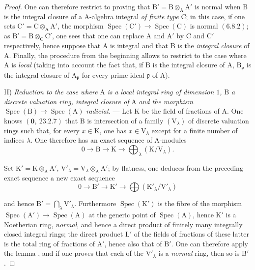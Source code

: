 \begin{proof}
One can therefore restrict to proving that $\mathrm{B}'=\mathrm{B}\otimes_\mathrm{A}\mathrm{A}'$ is normal when $\mathrm{B}$
is the integral closure of a $\mathrm{A}$-algebra integral \emph{of finite type} $\mathrm{C}$; in this case, if one sets
$\mathrm{C}'=\mathrm{C}\otimes_\mathrm{A}\mathrm{A}'$, the morphism $\operatorname{Spec}(\mathrm{C}')\to\operatorname{Spec}(\mathrm{C})$ is normal $(6.8.2)$; as
$\mathrm{B}'=\mathrm{B}\otimes_\mathrm{C}\mathrm{C}'$,
one sees that one can replace $\mathrm{A}$ and $\mathrm{A}'$ by $\mathrm{C}$ and $\mathrm{C}'$ respectively, hence suppose that $\mathrm{A}$
is integral and that $\mathrm{B}$ is the \emph{integral closure} of $\mathrm{A}$. Finally, the procedure from the beginning allows to
restrict to the case where $\mathrm{A}$ is \emph{local} (taking into account the fact that, if $\mathrm{B}$ is the integral closure of $\mathrm{A}$,
$\mathrm{B}_\mathfrak{p}$ is the integral closure of $\mathrm{A}_\mathfrak{p}$ for every prime ideal $\mathfrak{p}$ of $\mathrm{A}$).

II) \emph{Reduction to the case where} $\mathrm{A}$ \emph{is a local integral ring of dimension $1$,} $\mathrm{B}$ \emph{a discrete
valuation ring, integral closure of} $\mathrm{A}$ \emph{and the morphism} $\operatorname{Spec}(\mathrm{B})\to\operatorname{Spec}(\mathrm{A})$ \emph{radicial.} ---
Let $\mathrm{K}$ be the field of fractions of $\mathrm{A}$. One knows $(\mathbf{0},~23.2.7)$ that $\mathrm{B}$ is intersection of a
family $(\mathrm{V}_\lambda)$ of discrete valuation rings such that, for every $x\in\mathrm{K}$, one has $x\in\mathrm{V}_\lambda$
except for a finite number of indices $\lambda$. One therefore has an exact sequence of $\mathrm{A}$-modules
\[
  0\to\mathrm{B}\to\mathrm{K}\to\bigoplus_\lambda(\mathrm{K}/\mathrm{V}_\lambda).
\]

Set $\mathrm{K}'=\mathrm{K}\otimes_\mathrm{A}\mathrm{A}'$, $\mathrm{V}'_\lambda=\mathrm{V}_\lambda\otimes_\mathrm{A}\mathrm{A}'$; by flatness, one deduces from the preceding
exact sequence a new exact sequence
\[
  0\to\mathrm{B}'\to\mathrm{K}'\to\bigoplus(\mathrm{K}'_\lambda/\mathrm{V}'_\lambda)
\]


and hence $\mathrm{B}'=\bigcap_\lambda\mathrm{V}'_\lambda$. Furthermore $\operatorname{Spec}(\mathrm{K}')$ is the fibre of the morphism $\operatorname{Spec}(\mathrm{A}')\to\operatorname{Spec}(\mathrm{A})$
at the generic point of $\operatorname{Spec}(\mathrm{A})$, hence $\mathrm{K}'$ is a Noetherian ring, \emph{normal}, and hence
a direct product of finitely many integrally closed integral rings; the direct product
$\mathrm{L}'$ of the fields of fractions of these latter is the total ring of fractions of $\mathrm{A}'$,
hence also that of $\mathrm{B}'$. One can therefore apply the lemma , and if one proves
that each of the $\mathrm{V}'_\lambda$ is a \emph{normal} ring, then so is $\mathrm{B}'$.


\end{proof}
